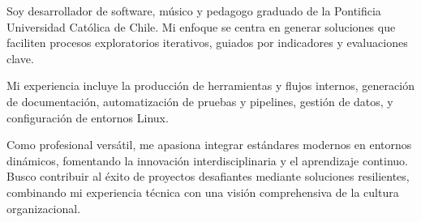 

\begin{cvparagraph}

    Soy desarrollador de software, músico y pedagogo graduado de la Pontificia
    Universidad Católica de Chile. Mi enfoque se centra en generar soluciones
    que faciliten procesos exploratorios iterativos, guiados por indicadores y
    evaluaciones clave.

    Mi experiencia incluye la producción de herramientas y flujos internos,
    generación de documentación, automatización de pruebas y pipelines, gestión
    de datos, y configuración de entornos Linux.

    Como profesional versátil, me apasiona integrar estándares modernos en
    entornos dinámicos, fomentando la innovación interdisciplinaria y el
    aprendizaje continuo. Busco contribuir al éxito de proyectos desafiantes
    mediante soluciones resilientes, combinando mi experiencia técnica con una
    visión comprehensiva de la cultura organizacional.

\end{cvparagraph}

